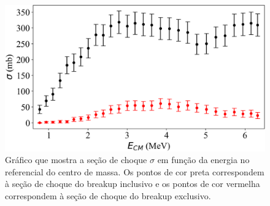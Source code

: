 \documentclass[a4paper,12pt,oneside]{book}
\begin{document}
\begin{figure}[H]
\centering
    \includegraphics[scale = 1., width=0.7\columnwidth]{figs/contagens_energia.png}
    \caption{Gráfico que mostra a seção de choque $\sigma$ em função da energia no referencial do centro de massa. Os pontos de cor preta correspondem à seção de choque do breakup inclusivo e os pontos de cor vermelha correspondem à seção de choque do breakup exclusivo.}
    \label{fig:contagem_energia}
\end{figure}
\end{document}
